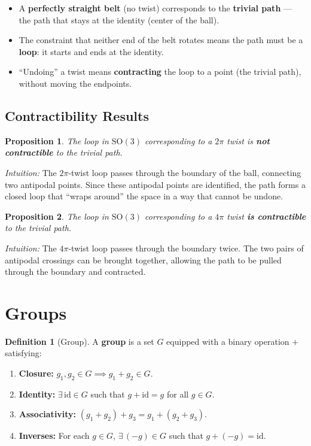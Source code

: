 \documentclass[11pt,a4paper]{article}
\theoremstyle{definition}
\newtheorem{definition}{Definition}[section]
\theoremstyle{plain}
\newtheorem{proposition}{Proposition}[section]
\theoremstyle{remark}
\begin{document}
\begin{itemize}
    \item A \textbf{perfectly straight belt} (no twist) corresponds to the \textbf{trivial path} --- the path that stays at the identity (center of the ball).
    \item The constraint that neither end of the belt rotates means the path must be a \textbf{loop}: it starts and ends at the identity.
    \item ``Undoing'' a twist means \textbf{contracting} the loop to a point (the trivial path), without moving the endpoints.
\end{itemize}

\subsection{Contractibility Results}

\begin{proposition}
    The loop in $\mathrm{SO}(3)$ corresponding to a $2\pi$ twist is \textbf{not contractible} to the trivial path.
\end{proposition}

\textit{Intuition:} The $2\pi$-twist loop passes through the boundary of the ball, connecting two antipodal points. Since these antipodal points are identified, the path forms a closed loop that ``wraps around'' the space in a way that cannot be undone.

\begin{proposition}
    The loop in $\mathrm{SO}(3)$ corresponding to a $4\pi$ twist \textbf{is contractible} to the trivial path.
\end{proposition}

\textit{Intuition:} The $4\pi$-twist loop passes through the boundary twice. The two pairs of antipodal crossings can be brought together, allowing the path to be pulled through the boundary and contracted.

\section{Groups}

\begin{definition}[Group]
    A \textbf{group} is a set $G$ equipped with a binary operation $+$ satisfying:
    \begin{enumerate}[label=(\arabic*)]
        \item \textbf{Closure:} $g_1, g_2 \in G \implies g_1 + g_2 \in G$.
        \item \textbf{Identity:} $\exists\, \mathrm{id} \in G$ such that $g + \mathrm{id} = g$ for all $g \in G$.
        \item \textbf{Associativity:} $(g_1 + g_2) + g_3 = g_1 + (g_2 + g_3)$.
        \item \textbf{Inverses:} For each $g \in G$, $\exists\, (-g) \in G$ such that $g + (-g) = \mathrm{id}$.
    \end{enumerate}
\end{definition}
\end{document}
